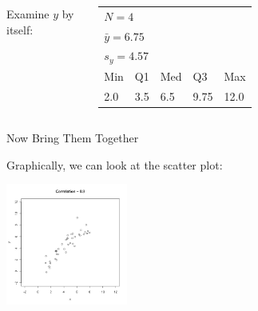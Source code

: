 \begin{frame}
\begin{columns}
     {

      Examine $y$ by itself: \\
      \begin{tabular}{lllll}
        \multicolumn{5}{l}{$N=4$} \\
        \multicolumn{5}{l}{$\bar{y}=6.75$} \\
        \multicolumn{5}{l}{$s_y=4.57$} \\
        Min & Q1 & Med & Q3 & Max \\
        2.0 & 3.5 & 6.5 & 9.75 & 12.0
      \end{tabular}



    }


  \end{columns}


\end{frame}

\begin{frame}{Now Bring Them Together}

  Graphically, we can look at the scatter plot:

  \includegraphics[height=4cm]{img/correlation09}
  
\end{frame}




